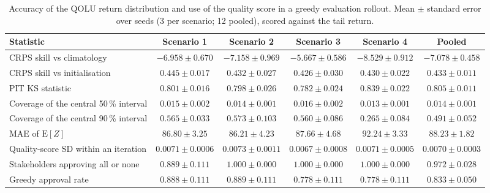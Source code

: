 \begin{table}[htbp]
  \centering
  \caption{Accuracy of the QOLU return distribution and use of the quality score in a greedy evaluation rollout. Mean $\pm$ standard error over seeds (3 per scenario; 12 pooled), scored against the tail return.}
  \label{tab:p2-distribution}
  \begin{tabular}{lccccc}
    \toprule
    Statistic & Scenario 1 & Scenario 2 & Scenario 3 & Scenario 4 & Pooled \\
    \midrule
    CRPS skill vs climatology & $-6.958 \pm 0.670$ & $-7.158 \pm 0.969$ & $-5.667 \pm 0.586$ & $-8.529 \pm 0.912$ & $-7.078 \pm 0.458$ \\
    CRPS skill vs initialisation & $0.445 \pm 0.017$ & $0.432 \pm 0.027$ & $0.426 \pm 0.030$ & $0.430 \pm 0.022$ & $0.433 \pm 0.011$ \\
    PIT KS statistic & $0.801 \pm 0.016$ & $0.798 \pm 0.026$ & $0.782 \pm 0.024$ & $0.839 \pm 0.022$ & $0.805 \pm 0.011$ \\
    Coverage of the central 50\,\% interval & $0.015 \pm 0.002$ & $0.014 \pm 0.001$ & $0.016 \pm 0.002$ & $0.013 \pm 0.001$ & $0.014 \pm 0.001$ \\
    Coverage of the central 90\,\% interval & $0.565 \pm 0.033$ & $0.573 \pm 0.103$ & $0.560 \pm 0.086$ & $0.265 \pm 0.084$ & $0.491 \pm 0.052$ \\
    MAE of $\mathrm{E}[Z]$ & $86.80 \pm 3.25$ & $86.21 \pm 4.23$ & $87.66 \pm 4.68$ & $92.24 \pm 3.33$ & $88.23 \pm 1.82$ \\
    Quality-score SD within an iteration & $0.0071 \pm 0.0006$ & $0.0073 \pm 0.0011$ & $0.0067 \pm 0.0008$ & $0.0071 \pm 0.0005$ & $0.0070 \pm 0.0003$ \\
    Stakeholders approving all or none & $0.889 \pm 0.111$ & $1.000 \pm 0.000$ & $1.000 \pm 0.000$ & $1.000 \pm 0.000$ & $0.972 \pm 0.028$ \\
    Greedy approval rate & $0.888 \pm 0.111$ & $0.889 \pm 0.111$ & $0.778 \pm 0.111$ & $0.778 \pm 0.111$ & $0.833 \pm 0.050$ \\
    \bottomrule
  \end{tabular}
\end{table}
